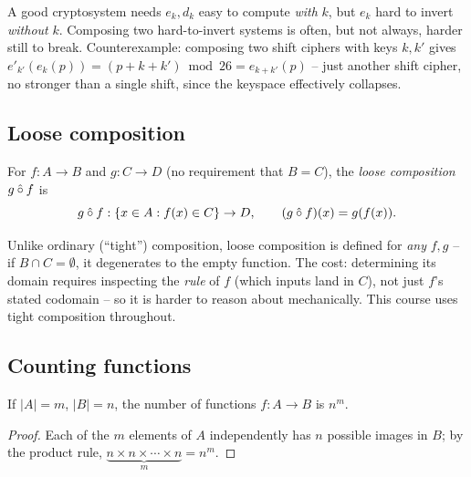 \documentclass[11pt]{article}
\begin{document}
\begin{note}
A good cryptosystem needs $e_k, d_k$ easy to compute \emph{with} $k$, but $e_k$ hard to invert \emph{without} $k$. Composing two hard-to-invert systems is often, but not always, harder still to break. Counterexample: composing two shift ciphers with keys $k,k'$ gives $e'_{k'}(e_k(p)) = (p+k+k') \bmod 26 = e_{k+k'}(p)$ -- just another shift cipher, no stronger than a single shift, since the keyspace effectively collapses.
\end{note}

\subsection{Loose composition}
\label{sec:2-11}

\begin{definition}
For $f: A \to B$ and $g: C \to D$ (no requirement that $B = C$), the \emph{loose composition} $g \mathbin{\mathaccent"705E\relax\circ} f$ is
\[
g \mathbin{\mathaccent"705E\relax\circ} f : \{x \in A : f(x) \in C\} \to D, \qquad (g \mathbin{\mathaccent"705E\relax\circ} f)(x) = g(f(x)).
\]
\end{definition}

\begin{note}
Unlike ordinary (``tight'') composition, loose composition is defined for \emph{any} $f,g$ -- if $B \cap C = \emptyset$, it degenerates to the empty function. The cost: determining its domain requires inspecting the \emph{rule} of $f$ (which inputs land in $C$), not just $f$'s stated codomain -- so it is harder to reason about mechanically. This course uses tight composition throughout.
\end{note}

\subsection{Counting functions}
\label{sec:2-12}

\begin{theorem}
If $|A|=m$, $|B|=n$, the number of functions $f: A \to B$ is $n^m$.
\end{theorem}
\begin{proof}
Each of the $m$ elements of $A$ independently has $n$ possible images in $B$; by the product rule, $\underbrace{n \times n \times \cdots \times n}_{m} = n^m$.
\end{proof}
\end{document}
